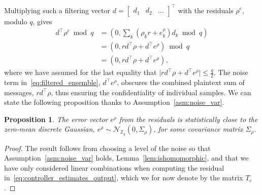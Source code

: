 \documentclass[journal, twoside, web]{ieeecolorpreprint}
\newtheorem{prop}{Proposition}
\begin{document}

Multiplying such a filtering vector $d=\begin{bmatrix} d_1 & d_2 & \dots \end{bmatrix}^\top$ with the residuals $\rho^e$, modulo $q$, gives
\begin{equation} \label{eq:filtered_ensemble}
    \begin{aligned}
      d^\top \rho^e \bmod q  &= (0, \sum \limits_k (\rho _kr+e_k^\rho)d_k \bmod q) \\
    & = (0, r d^\top \rho + d^\top e^\rho) \bmod q \\& = (0, r d^\top \rho + d^\top e^\rho),
    \end{aligned}
\end{equation}
where we have assumed for the last equality that $\vert r d^\top \rho + d^\top e^\rho \vert \leq \frac{q}{2}$. 
The noise term in~\eqref{eq:filtered_ensemble}, $d^\top e^\rho$, obscures the combined plaintext sum of messages, $r d^\top \rho$, thus ensuring the confidentiality of individual samples. We can state the following proposition thanks to Assumption~\ref{asm:noise_var}.
\begin{prop} \label{prop:error_dist}
The error vector $e^\rho$ from the residuals is statistically close to the zero-mean discrete Gaussian, $e^\rho \sim \mathcal{N}_{\mathbb{Z}_q}(0,\Sigma_\rho)$, for some covariance matrix $\Sigma_\rho$.
\end{prop}
\begin{proof}
    The result follows from choosing a level of the noise so that Assumption~\ref{asm:noise_var} holds, Lemma~\ref{lem:ishomomorphic}, and that we have only considered linear combinations when computing the residual in~\eqref{eq:controller_estimates_output}, which we for now denote by the matrix $T_c$.
\end{proof}
\end{document}
